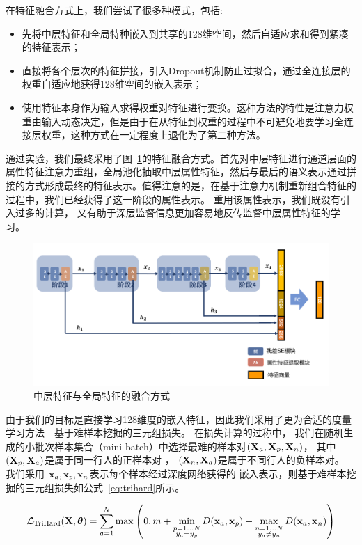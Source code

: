 在特征融合方式上，我们尝试了很多种模式，包括:
\begin{itemize}
	\item 先将中层特征和全局特种嵌入到共享的128维空间，然后自适应求和得到紧凑的特征表示；
	\item 直接将各个层次的特征拼接，引入Dropout机制防止过拟合，通过全连接层的权重自适应地获得128维空间的嵌入表示；
	\item 使用特征本身作为输入求得权重对特征进行变换。这种方法的特性是注意力权重由输入动态决定，但是由于在从特征到权重的过程中不可避免地要学习全连接层权重，这种方式在一定程度上退化为了第二种方法。
\end{itemize}

通过实验，我们最终采用了图~\ref{fig:fusion}的特征融合方式。首先对中层特征进行通道层面的属性特征注意力重组，全局池化抽取中层属性特征，然后与最后的语义表示通过拼接的方式形成最终的特征表示。值得注意的是，在基于注意力机制重新组合特征的过程中，我们已经获得了这一阶段的属性表示。
重用该属性表示，我们既没有引入过多的计算，
又有助于深层监督信息更加容易地反传监督中层属性特征的学习。

\begin{figure}
	\centering
	\includegraphics[width=\textwidth]{fig/2018-05-11-16-54-07.png}
	\caption{中层特征与全局特征的融合方式}
	\label{fig:fusion}
\end{figure}

由于我们的目标是直接学习128维度的嵌入特征，因此我们采用了更为合适的度量学习方法---基于难样本挖掘的三元组损失\cite{hermans2017defense}。
在损失计算的过称中，
我们在随机生成的小批次样本集合（mini-batch）中选择最难的样本对$({\mathbf{X}}_a, {\mathbf{X}}_p, {\mathbf{X}}_n)$，
其中 $({\mathbf{X}}_p, {\mathbf{X}}_a)$是属于同一行人的正样本对
， $({\mathbf{X}}_n, {\mathbf{X}}_a)$是属于不同行人的负样本对。
我们采用 ${\mathbf{x}}_a, {\mathbf{x}}_p, {\mathbf{x}}_n$表示每个样本经过深度网络获得的
嵌入表示，则基于难样本挖掘的三元组损失如公式~\ref{eq:trihard}所示。

\begin{equation}
	\mathcal{L}_{\textrm{TriHard}} ({\mathbf{X}}, {\boldsymbol{\theta}}) = \sum_{a=1}^{N} \max\left(
	0, m + \min_{\substack{
			p=1...N \\
			y_a = y_p}
	} D({\mathbf{x}}_a, {\mathbf{x}}_p)
	-  \max_{ \substack{
			n=1...N \\
			y_a \neq y_n }
	} D({\mathbf{x}}_a,{\mathbf{x}}_n)
	\right) \label{eq:trihard}
\end{equation}

